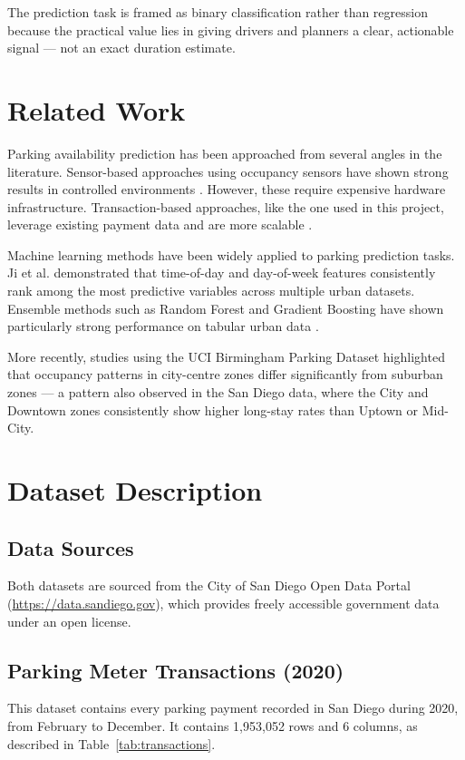 \documentclass[12pt, a4paper]{article}
\begin{document}
The prediction task is framed as binary classification rather than
regression because the practical value lies in giving drivers and
planners a clear, actionable signal --- not an exact duration estimate.

\section{Related Work}

Parking availability prediction has been approached from several angles
in the literature. Sensor-based approaches using occupancy sensors have
shown strong results in controlled environments \cite{zheng2015}.
However, these require expensive hardware infrastructure.
Transaction-based approaches, like the one used in this project, leverage
existing payment data and are more scalable \cite{shoup2006}.

Machine learning methods have been widely applied to parking prediction
tasks. Ji et al. \cite{ji2014} demonstrated that time-of-day and
day-of-week features consistently rank among the most predictive variables
across multiple urban datasets. Ensemble methods such as Random Forest and
Gradient Boosting have shown particularly strong performance on tabular
urban data \cite{chen2016}.

More recently, studies using the UCI Birmingham Parking Dataset
\cite{uci2016} highlighted that occupancy patterns in city-centre zones
differ significantly from suburban zones --- a pattern also observed in
the San Diego data, where the City and Downtown zones consistently show
higher long-stay rates than Uptown or Mid-City.

\section{Dataset Description}

\subsection{Data Sources}
Both datasets are sourced from the City of San Diego Open Data Portal
(\url{https://data.sandiego.gov}), which provides freely accessible
government data under an open license.

\subsection{Parking Meter Transactions (2020)}
This dataset contains every parking payment recorded in San Diego
during 2020, from February to December. It contains 1,953,052 rows
and 6 columns, as described in Table~\ref{tab:transactions}.
\end{document}
